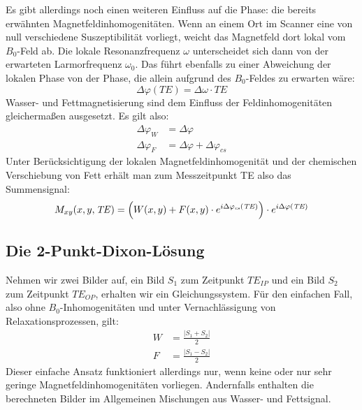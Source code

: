 \documentclass[a4paper,11pt]{article}
\newcommand{\Mxy}{M_{xy}}
\newcommand{\dphi}{\Delta\varphi}
\newcommand{\cs}{_{\mathit{cs}}}
\newcommand{\TE}{\mathit{TE}}
\newcommand{\IP}{_{\mathit{IP}}}
\newcommand{\OP}{_{\mathit{OP}}}
\begin{document}
Es gibt allerdings noch einen weiteren Einfluss auf die Phase: die bereits erwähnten Magnetfeldinhomogenitäten. Wenn an einem Ort im Scanner eine von null verschiedene Suszeptibilität vorliegt, weicht das Magnetfeld dort lokal vom $B_0$-Feld ab. Die lokale Resonanzfrequenz $\omega$ unterscheidet sich dann von der erwarteten Larmorfrequenz $\omega_0$. Das führt ebenfalls zu einer Abweichung der lokalen Phase von der Phase, die allein aufgrund des $B_0$-Feldes zu erwarten wäre:
\[
\dphi(\TE) = \Delta\omega \cdot \TE
\]
Wasser- und Fettmagnetisierung sind dem Einfluss der Feldinhomogenitäten gleichermaßen ausgesetzt. Es gilt also:
\begin{align*}
\dphi_W &= \dphi\\
\dphi_F &= \dphi + \dphi\cs
\end{align*}
Unter Berücksichtigung der lokalen Magnetfeldinhomogenität und der chemischen Verschiebung von Fett erhält man zum Messzeitpunkt TE also das Summensignal:
\[
\Mxy(x, y, \TE) = \Bigl(W(x, y) + F(x, y) \cdot e^{i\dphi\cs(\TE)}\Bigr) \cdot e^{i\dphi(\TE)}
\]

\subsection{Die 2-Punkt-Dixon-Lösung}
Nehmen wir zwei Bilder auf, ein Bild $S_1$ zum Zeitpunkt $\TE\IP$ und ein Bild $S_2$ zum Zeitpunkt $\TE\OP$, erhalten wir ein Gleichungssystem. Für den einfachen Fall, also ohne $B_0$-Inhomogenitäten und unter Vernachlässigung von Relaxationsprozessen, gilt:
\begin{align*}
W &= \frac{\lvert S_1 + S_2 \rvert}{2}\\[2pt]
F &= \frac{\lvert S_1 - S_2 \rvert}{2}
\end{align*}
Dieser einfache Ansatz funktioniert allerdings nur, wenn keine oder nur sehr geringe Magnetfeldinhomogenitäten vorliegen. Andernfalls enthalten die berechneten Bilder im Allgemeinen Mischungen aus Wasser- und Fettsignal.
\end{document}
